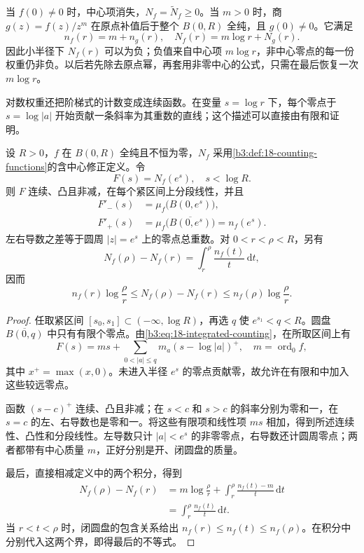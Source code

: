 \ProseParagraphBreak

当 \(f(0)\ne0\) 时，中心项消失，\(N_f=\widetilde N_f\ge0\)。当 \(m>0\) 时，商 \(g(z)=f(z)/z^m\) 在原点补值后于整个 \(B(0,R)\) 全纯，且 \(g(0)\ne0\)。它满足
\[
 n_f(r)=m+n_g(r),\quad N_f(r)=m\log r+N_g(r).
\]
因此小半径下 \(N_f(r)\) 可以为负；负值来自中心项 \(m\log r\)，非中心零点的每一份权重仍非负。以后若先除去原点幂，再套用非零中心的公式，只需在最后恢复一次 \(m\log r\)。

\ProseParagraphBreak

对数权重还把阶梯式的计数变成连续函数。在变量 \(s=\log r\) 下，每个零点于 \(s=\log|a|\) 开始贡献一条斜率为其重数的直线；这个描述可以直接由有限和证明。

\begin{proposition}[积分计数的斜率]\label{b3:prop:18-counting-slopes}
设 \(R>0\)，\(f\) 在 \(B(0,R)\) 全纯且不恒为零，\(N_f\) 采用\cref{b3:def:18-counting-functions}的含中心修正定义。令
\[
 F(s)=N_f(e^s),\quad s<\log R.
\]
则 \(F\) 连续、凸且非减，在每个紧区间上分段线性，并且
\begin{align*}
 F'_-(s)&=\mu_f\bigl(B(0,e^s)\bigr),\\
 F'_+(s)&=\mu_f\bigl(\overline{B(0,e^s)}\bigr)=n_f(e^s).
\end{align*}
左右导数之差等于圆周 \(|z|=e^s\) 上的零点总重数。对 \(0<r<\rho<R\)，另有
\begin{equation}\label{b3:eq:18-counting-increments}
 N_f(\rho)-N_f(r)=\int_r^\rho\frac{n_f(t)}{t}\,\mathrm dt,
\end{equation}
因而
\[
 n_f(r)\log\frac\rho r
 \le N_f(\rho)-N_f(r)
 \le n_f(\rho)\log\frac\rho r.
\]
\end{proposition}
\begin{proof}
任取紧区间 \([s_0,s_1]\subset(-\infty,\log R)\)，再选 \(q\) 使 \(e^{s_1}<q<R\)。圆盘 \(\overline{B(0,q)}\) 中只有有限个零点。由\eqref{b3:eq:18-integrated-counting}，在所取区间上有
\[
 F(s)=ms+\sum_{0<|a|\le q}m_a(s-\log|a|)^+,
 \quad m=\operatorname{ord}_0f,
\]
其中 \(x^+=\max(x,0)\)。未进入半径 \(e^s\) 的零点贡献零，故允许在有限和中加入这些较远零点。

函数 \((s-c)^+\) 连续、凸且非减；在 \(s<c\) 和 \(s>c\) 的斜率分别为零和一，在 \(s=c\) 的左、右导数也是零和一。将这些有限项和线性项 \(ms\) 相加，得到所述连续性、凸性和分段线性。左导数只计 \(|a|<e^s\) 的非零零点，右导数还计圆周零点；两者都带有中心质量 \(m\)，正好分别是开、闭圆盘的质量。

最后，直接相减定义中的两个积分，得到
\begin{align*}
 N_f(\rho)-N_f(r)
 &=m\log\frac\rho r+\int_r^\rho\frac{n_f(t)-m}{t}\,\mathrm dt\\
 &=\int_r^\rho\frac{n_f(t)}{t}\,\mathrm dt.
\end{align*}
当 \(r<t<\rho\) 时，闭圆盘的包含关系给出 \(n_f(r)\le n_f(t)\le n_f(\rho)\)。在积分中分别代入这两个界，即得最后的不等式。
\end{proof}

